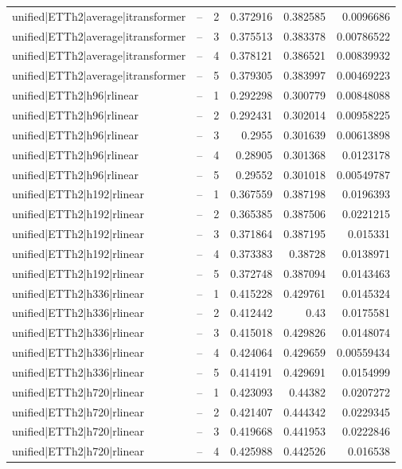 \begin{longtable}{llrrrr}
unified|ETTh2|average|itransformer & -- & 2 & 0.372916 & 0.382585 & 0.0096686 \\
unified|ETTh2|average|itransformer & -- & 3 & 0.375513 & 0.383378 & 0.00786522 \\
unified|ETTh2|average|itransformer & -- & 4 & 0.378121 & 0.386521 & 0.00839932 \\
unified|ETTh2|average|itransformer & -- & 5 & 0.379305 & 0.383997 & 0.00469223 \\
unified|ETTh2|h96|rlinear & -- & 1 & 0.292298 & 0.300779 & 0.00848088 \\
unified|ETTh2|h96|rlinear & -- & 2 & 0.292431 & 0.302014 & 0.00958225 \\
unified|ETTh2|h96|rlinear & -- & 3 & 0.2955 & 0.301639 & 0.00613898 \\
unified|ETTh2|h96|rlinear & -- & 4 & 0.28905 & 0.301368 & 0.0123178 \\
unified|ETTh2|h96|rlinear & -- & 5 & 0.29552 & 0.301018 & 0.00549787 \\
unified|ETTh2|h192|rlinear & -- & 1 & 0.367559 & 0.387198 & 0.0196393 \\
unified|ETTh2|h192|rlinear & -- & 2 & 0.365385 & 0.387506 & 0.0221215 \\
unified|ETTh2|h192|rlinear & -- & 3 & 0.371864 & 0.387195 & 0.015331 \\
unified|ETTh2|h192|rlinear & -- & 4 & 0.373383 & 0.38728 & 0.0138971 \\
unified|ETTh2|h192|rlinear & -- & 5 & 0.372748 & 0.387094 & 0.0143463 \\
unified|ETTh2|h336|rlinear & -- & 1 & 0.415228 & 0.429761 & 0.0145324 \\
unified|ETTh2|h336|rlinear & -- & 2 & 0.412442 & 0.43 & 0.0175581 \\
unified|ETTh2|h336|rlinear & -- & 3 & 0.415018 & 0.429826 & 0.0148074 \\
unified|ETTh2|h336|rlinear & -- & 4 & 0.424064 & 0.429659 & 0.00559434 \\
unified|ETTh2|h336|rlinear & -- & 5 & 0.414191 & 0.429691 & 0.0154999 \\
unified|ETTh2|h720|rlinear & -- & 1 & 0.423093 & 0.44382 & 0.0207272 \\
unified|ETTh2|h720|rlinear & -- & 2 & 0.421407 & 0.444342 & 0.0229345 \\
unified|ETTh2|h720|rlinear & -- & 3 & 0.419668 & 0.441953 & 0.0222846 \\
unified|ETTh2|h720|rlinear & -- & 4 & 0.425988 & 0.442526 & 0.016538 \\

\end{longtable}
